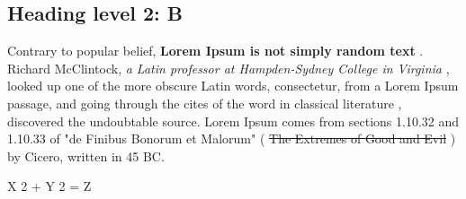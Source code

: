 \documentclass[11pt,a4paper]{article}
\begin{document}
\subsection{Heading level 2: B}

Contrary to popular belief,  \textbf{Lorem Ipsum is not simply random text} . Richard McClintock,  \textit{a Latin professor at Hampden-Sydney College in Virginia} , looked up one of the more obscure Latin words, consectetur, from a Lorem Ipsum passage,  and going through the cites of the word in classical literature , discovered the undoubtable source. Lorem Ipsum comes from sections 1.10.32 and 1.10.33 of "de Finibus Bonorum et Malorum" ( \sout{The Extremes of Good and Evil} ) by Cicero, written in 45 BC.

X 2  + Y 2  = Z
\end{document}

